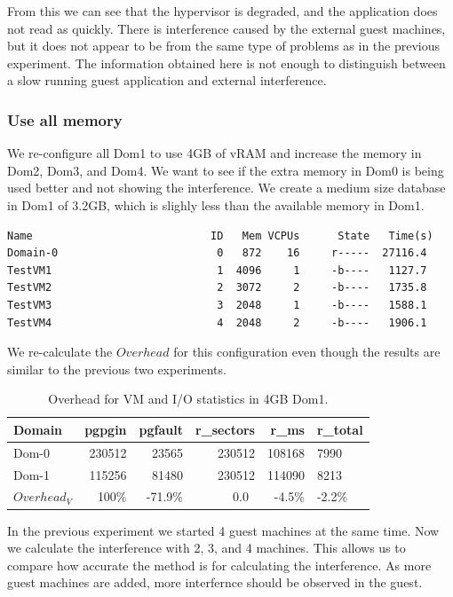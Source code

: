 From this we can see that the hypervisor is degraded, and the application does not read as quickly.  There is interference caused by the external guest machines, but it does not appear to be from the same type of problems as in the previous experiment. The information obtained here is not enough to distinguish between a slow running guest application and external interference.

\subsubsection{Use all memory}
We re-configure all Dom1 to use 4GB of vRAM and increase the memory in Dom2, Dom3, and Dom4. We want to see if the extra memory in Dom0 is being used better and not showing the interference.
We create a medium size database in Dom1 of 3.2GB, which is slighly less than the available memory in Dom1. 

\begin{Verbatim}
Name                            ID   Mem VCPUs      State   Time(s)
Domain-0                         0   872    16     r-----  27116.4
TestVM1                          1  4096     1     -b----   1127.7
TestVM2                          2  3072     2     -b----   1735.8
TestVM3                          3  2048     1     -b----   1588.1
TestVM4                          4  2048     2     -b----   1906.1
\end{Verbatim}

We re-calculate the $Overhead$ for this configuration even though the results are similar to the previous two experiments.

\begin{table}[h]
\begin{tabular}{ l r r r r p{5cm} }
    Domain &  pgpgin &   pgfault & r\_sectors & r\_ms & r\_total \\
    \hline
    Dom-0  &  230512 &   23565   & 230512   & 108168 &  7990 \\
    Dom-1  &  115256 &   81480   & 230512   & 114090 &  8213 \\
$Overhead_V$ & 100\% &   -71.9\% & 0.0\	    & -4.5\%  & -2.2\% \\
    \hline
\end{tabular}
\caption{Overhead for VM and I/O statistics in 4GB Dom1.}
\label{fig:OverheadMed}
\end{table}

In the previous experiment we started 4 guest machines at the same time.  Now we calculate the interference with 2, 3, and 4 machines.   This allows us to compare how accurate the method is for calculating the interference.  As more guest machines are added, more interfernce should be observed in the guest. 

